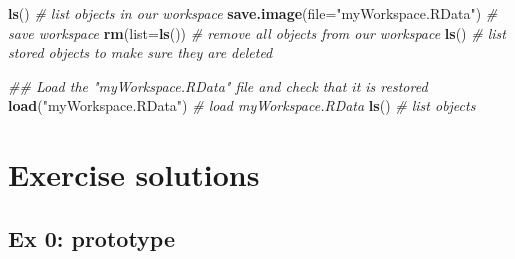 \documentclass[
]{book}
\newenvironment{Shaded}{\begin{snugshade}}{\end{snugshade}}
\newcommand{\CommentTok}[1]{\textcolor[rgb]{0.56,0.35,0.01}{\textit{#1}}}
\newcommand{\DataTypeTok}[1]{\textcolor[rgb]{0.13,0.29,0.53}{#1}}
\newcommand{\KeywordTok}[1]{\textcolor[rgb]{0.13,0.29,0.53}{\textbf{#1}}}
\newcommand{\NormalTok}[1]{#1}
\newcommand{\StringTok}[1]{\textcolor[rgb]{0.31,0.60,0.02}{#1}}
\begin{document}
\begin{Shaded}
\begin{Highlighting}[]
\KeywordTok{ls}\NormalTok{() }\CommentTok{# list objects in our workspace}
\KeywordTok{save.image}\NormalTok{(}\DataTypeTok{file=}\StringTok{"myWorkspace.RData"}\NormalTok{) }\CommentTok{# save workspace }
\KeywordTok{rm}\NormalTok{(}\DataTypeTok{list=}\KeywordTok{ls}\NormalTok{()) }\CommentTok{# remove all objects from our workspace }
\KeywordTok{ls}\NormalTok{() }\CommentTok{# list stored objects to make sure they are deleted}
\end{Highlighting}
\end{Shaded}

\begin{Shaded}
\begin{Highlighting}[]
\CommentTok{## Load the "myWorkspace.RData" file and check that it is restored}
\KeywordTok{load}\NormalTok{(}\StringTok{"myWorkspace.RData"}\NormalTok{) }\CommentTok{# load myWorkspace.RData}
\KeywordTok{ls}\NormalTok{() }\CommentTok{# list objects}
\end{Highlighting}
\end{Shaded}

\hypertarget{exercise-solutions}{%
\section{Exercise solutions}\label{exercise-solutions}}

\hypertarget{ex-0-prototype}{%
\subsection{Ex 0: prototype}\label{ex-0-prototype}}
\end{document}
